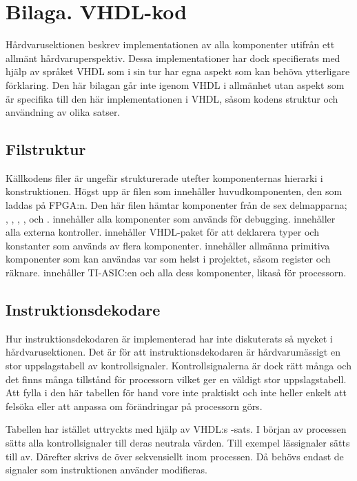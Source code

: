 \documentclass[main.tex]{subfiles}
\begin{document}
\section{Bilaga. VHDL-kod}
Hårdvarusektionen beskrev implementationen av alla komponenter utifrån ett
allmänt hårdvaruperspektiv. Dessa implementationer har dock specifierats med
hjälp av språket VHDL som i sin tur har egna aspekt som kan behöva ytterligare
förklaring. Den här bilagan går inte igenom VHDL i allmänhet utan aspekt som är
specifika till den här implementationen i VHDL, såsom kodens struktur och
användning av olika satser.

\subsection{Filstruktur}
Källkodens filer är ungefär strukturerade utefter komponenternas hierarki i
konstruktionen. Högst upp är filen  som innehåller
huvudkomponenten, den som laddas på FPGA:n. Den här filen hämtar komponenter
från de sex delmapparna; , , , ,
 och .  innehåller alla komponenter som används
för debugging.  innehåller alla externa kontroller. 
innehåller VHDL-paket för att deklarera typer och konstanter som används av
flera komponenter.  innehåller allmänna primitiva komponenter som kan
användas var som helst i projektet, såsom register och räknare.  
innehåller TI-ASIC:en och alla dess komponenter,  likaså för
processorn.

\subsection{Instruktionsdekodare}
Hur instruktionsdekodaren är implementerad har inte diskuterats så mycket i
hårdvaru\-sektionen. Det är för att instruktionsdekodaren är hårdvarumässigt en
stor uppslagstabell av kontrollsignaler. Kontrollsignalerna är dock rätt många
och det finns många tillstånd för processorn vilket ger en väldigt stor
uppslagstabell. Att fylla i den här tabellen för hand vore inte praktiskt och
inte heller enkelt att felsöka eller att anpassa om förändringar på processorn
görs.

Tabellen har istället uttryckts med hjälp av VHDL:s -sats. I
början av processen sätts alla kontrollsignaler till deras neutrala värden.
Till exempel lässignaler sätts till av. Därefter skrivs de över sekvensiellt
inom processen. Då behövs endast de signaler som instruktionen använder
modifieras.
\end{document}
